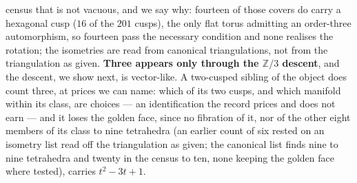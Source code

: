 \documentclass[11pt,a4paper]{article}
\theoremstyle{definition}
\theoremstyle{remark}
\newcommand{\Z}{\mathbb{Z}}
\begin{document}
census that is not vacuous, and we say why: fourteen of those covers do carry a hexagonal cusp ($16$ of the $201$ cusps),
the only flat torus admitting an order-three automorphism, so fourteen pass the necessary condition and none realises the
rotation; the isometries are read from canonical triangulations, not from the triangulation as given. \textbf{Three appears only through the $\Z/3$ descent}, and the descent, we show next, is
vector-like. A two-cusped sibling of the object does count three, at prices we can name: which of its two cusps, and which
manifold within its class, are choices --- an identification the record prices and does not earn --- and it loses the
golden face, since no fibration of it, nor of the other eight members of its class to nine tetrahedra (an earlier count of six rested on an isometry list read off the triangulation as given; the canonical list finds nine to nine tetrahedra and twenty in the census to ten, none keeping the golden face where tested), carries $t^2 - 3t + 1$.
\end{document}
